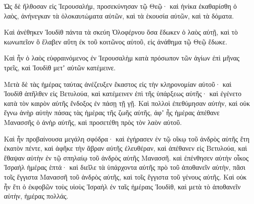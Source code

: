{\par }{\PP {}Ὡς δὲ ἤλθοσαν εἰς Ἱερουσαλήμ, προσεκύνησαν τῷ Θεῷ· καὶ ἡνίκα ἐκαθαρίσθη ὁ λαὸς, ἀνήνεγκαν τὰ ὁλοκαυτώματα αὐτῶν, καὶ τὰ ἑκουσία αὐτῶν, καὶ τὰ δόματα.
\par }{\PP {}Καὶ ἀνέθηκεν Ἰουδὶθ πάντα τὰ σκεύη Ὀλοφέρνου ὅσα ἔδωκεν ὁ λαὸς αὐτῇ, καὶ τὸ κωνωπεῖον ὃ ἔλαβεν αὕτη ἐκ τοῦ κοιτῶνος αὐτοῦ, εἰς ἀνάθημα τῷ Θεῷ ἔδωκε.
\par }{\PP {}Καὶ ἦν ὁ λαὸς εὐφραινόμενος ἐν Ἱερουσαλὴμ κατὰ πρόσωπον τῶν ἁγίων ἐπὶ μῆνας τρεῖς, καὶ Ἰουδὶθ μετʼ αὐτῶν κατέμεινε.
\par }{\PP {}Μετὰ δὲ τὰς ἡμέρας ταύτας ἀνέζευξεν ἕκαστος εἰς τὴν κληρονομίαν αὐτοῦ· καὶ Ἰουδὶθ ἀπῆλθεν εἰς Βετυλούα, καὶ κατέμεινεν ἐπὶ τῆς ὑπάρξεως αὐτῆς· καὶ ἐγένετο κατὰ τὸν καιρὸν αὐτῆς ἔνδοξος ἐν πάσῃ τῇ γῇ.
Καὶ πολλοὶ ἐπεθύμησαν αὐτὴν, καὶ οὐκ ἔγνω ἀνὴρ αὐτὴν πάσας τὰς ἡμέρας τῆς ζωῆς αὐτῆς, ἀφʼ ἧς ἡμέρας ἀπέθανε Μανασσῆς ὁ ἀνὴρ αὐτῆς, καὶ προσετέθη πρὸς τὸν λαὸν αὐτοῦ.
\par }{\PP {}Καὶ ἦν προβαίνουσα μεγάλη σφόδρα· καὶ ἐγήρασεν ἐν τῷ οἴκῳ τοῦ ἀνδρὸς αὐτῆς ἔτη ἑκατὸν πέντε, καὶ ἀφῆκε τὴν ἅβραν αὐτῆς ἐλευθέραν, καὶ ἀπέθανεν εἰς Βετυλούα, καὶ ἔθαψαν αὐτὴν ἐν τῷ σπηλαίῳ τοῦ ἀνδρὸς αὐτῆς Μανασσῆ.
καὶ ἐπένθησεν αὐτὴν οἶκος Ἰσραὴλ ἡμέρας ἑπτά· καὶ διεῖλε τὰ ὑπάρχοντα αὐτῆς πρὸ τοῦ ἀποθανεῖν αὐτὴν, πᾶσι τοῖς ἔγγιστα Μανασσῆ τοῦ ἀνδρὸς αὐτῆς, καὶ τοῖς ἔγγιστα τοῦ γένους αὐτῆς.
Καὶ οὐκ ἦν ἔτι ὁ ἐκφοβῶν τοὺς υἱοὺς Ἰσραὴλ ἐν ταῖς ἡμέραις Ἰουδὶθ, καὶ μετὰ τὸ ἀποθανεῖν αὐτὴν, ἡμέρας πολλάς.
\par }